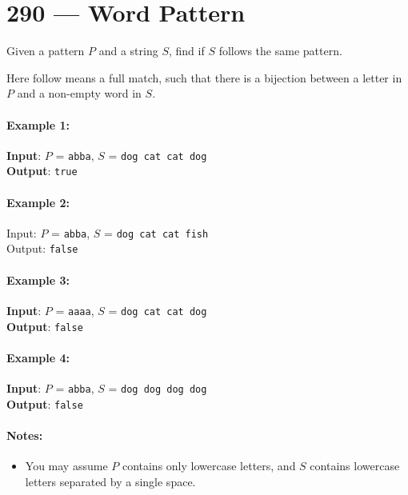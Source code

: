 \section{290 --- Word Pattern}
Given a pattern $P$ and a string $S$, find if $S$ follows the same pattern.
\par
Here follow means a full match, such that there is a bijection between a letter in $P$ and a non-empty word in $S$.

\paragraph{Example 1:}
\begin{flushleft}
\textbf{Input}: $P$ = \texttt{abba}, $S$ = \texttt{dog cat cat dog}
\\
\textbf{Output}: \texttt{true}
\end{flushleft}

\paragraph{Example 2:}
\begin{flushleft}
Input: $P$ = \texttt{abba}, $S$ = \texttt{dog cat cat fish}
\\
Output: \texttt{false}
\end{flushleft}

\paragraph{Example 3:}
\begin{flushleft}
\textbf{Input}: $P$ = \texttt{aaaa}, $S$ = \texttt{dog cat cat dog}
\\
\textbf{Output}: \texttt{false}
\end{flushleft}

\paragraph{Example 4:}
\begin{flushleft}
\textbf{Input}: $P$ = \texttt{abba}, $S$ = \texttt{dog dog dog dog}
\\
\textbf{Output}: \texttt{false}
\end{flushleft}

\paragraph{Notes:}
\begin{itemize}
\item You may assume $P$ contains only lowercase letters, and $S$ contains lowercase letters separated by a single space.
\end{itemize}
